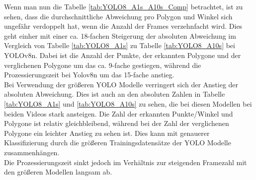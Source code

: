 {	Wenn man nun die Tabelle \ref{tab:YOLO8_A1s_A10s_Comp} betrachtet, ist zu sehen, dass die durchschnittliche Abweichung pro Polygon und Winkel sich ungefähr verdoppelt hat, wenn die Anzahl der Frames verzehnfacht wird. Dies geht einher mit einer ca. 18-fachen Steigerung der absoluten Abweichung im Vergleich von Tabelle \ref{tab:YOLO8_A1s} zu Tabelle \ref{tab:YOLO8_A10s} bei YOLOv8n. Dabei ist die Anzahl der Punkte, der erkannten Polygone und der verglichenen Polygone um das ca. 9-fache gestiegen, während die Prozessierungszeit bei Yolov8n um das 15-fache anstieg. \\
	Bei Verwendung der größeren YOLO Modelle verringert sich der Anstieg der absoluten Abweichung. Dies ist auch an den absoluten Zahlen in Tabelle \ref{tab:YOLO8_A1s} und \ref{tab:YOLO8_A10s} zu sehen, die bei diesen Modellen bei beiden Videos stark ansteigen. Die Zahl der erkannten Punkte/Winkel und Polygone ist relativ gleichbleibend, während bei der Zahl der verglichenen Polygone ein leichter Anstieg zu sehen ist. Dies kann mit genauerer Klassifizierung durch die größeren Trainingsdatensätze der YOLO Modelle zusammenhängen. \\
	Die Prozessierungszeit sinkt jedoch im Verhältnis zur steigenden Framezahl mit den größeren Modellen langsam ab.

}

